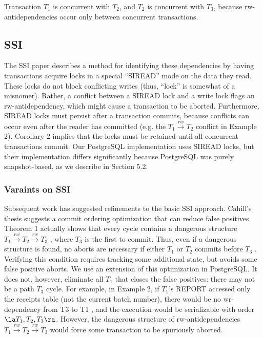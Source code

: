 \documentclass[11pt]{article}
\begin{document}
\begin{corollary}[]
Transaction \(T_1\) is concurrent with \(T_2\), and \(T_2\) is concurrent with \(T_3\), because
rw-antidependencies occur only between concurrent transactions.
\end{corollary}
\subsection{SSI}
\label{sec:org5967c8b}
The SSI paper describes a method for identifying these dependencies by having transactions acquire
locks in a special “SIREAD” mode on the data they read. These locks do not block conflicting writes
(thus, “lock” is somewhat of a misnomer). Rather, a conflict between a SIREAD lock and a write lock
flags an rw-antidependency, which might cause a transaction to be aborted. Furthermore, SIREAD locks
must persist after a transaction commits, because conflicts can occur even after the reader has
committed (e.g. the \(T_1\xrightarrow{rw}T_2\) conflict in Example 2). Corollary 2 implies that the
locks must be retained until all concurrent transactions commit. Our PostgreSQL implementation uses
SIREAD locks, but their implementation differs significantly because PostgreSQL was purely
snapshot-based, as we describe in Section 5.2.
\subsubsection{Varaints on SSI}
\label{sec:org3b2ce0b}
Subsequent work has suggested refinements to the basic SSI approach. Cahill’s thesis suggests a commit
ordering optimization that can reduce false positives. Theorem 1 actually shows that every cycle
contains a dangerous structure \(T_1\xrightarrow{rw}T_2\xrightarrow{rw}T_3\) , where \(T_3\) is the
first to commit. Thus, even if a dangerous structure is found, no aborts are necessary if either
\(T_1\) or \(T_2\) commits before \(T_3\) . Verifying this condition requires tracking some additional
state, but avoids some false positive aborts. We use an extension of this optimization in PostgreSQL.
It does not, however, eliminate all \(T_1\) that closes the false positives: there may not be a path
\(T_3\) cycle. For example, in Example 2, if \(T_1\)'s REPORT accessed only the receipts table (not
the current batch number), there would be no wr-dependency from T3 to T1 , and the execution would be
serializable with order \(\la T_1,T_2,T_3\ra\). However, the dangerous structure of
rw-antidependencies \(T_1\xrightarrow{rw}T_2\xrightarrow{rw}T_3\) would force some transaction to be
spuriously aborted.
\end{document}
